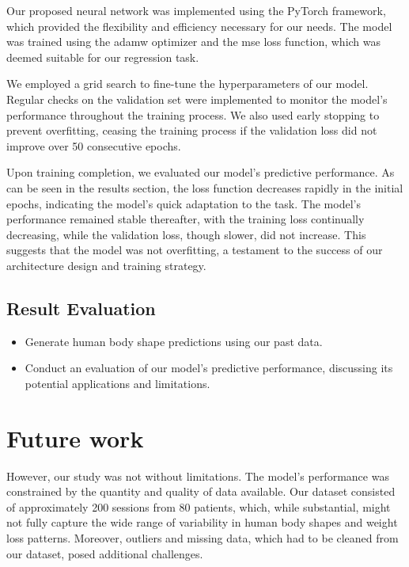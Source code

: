 Our proposed neural network was implemented using the PyTorch framework, which
provided the flexibility and efficiency necessary for our needs. The model was
trained using the \gls{adamw} optimizer and the \gls{mse} loss function, which
was deemed suitable for our regression task.

We employed a grid search to fine-tune the hyperparameters of our model.
Regular checks on the validation set were implemented to monitor the model's
performance throughout the training process. We also used early stopping to
prevent overfitting, ceasing the training process if the validation loss did
not improve over 50 consecutive epochs.

Upon training completion, we evaluated our model's predictive performance. As
can be seen in the results section, the loss function decreases rapidly in the
initial epochs, indicating the model's quick adaptation to the task. The
model's performance remained stable thereafter, with the training loss
continually decreasing, while the validation loss, though slower, did not
increase. This suggests that the model was not overfitting, a testament to the
success of our architecture design and training strategy.

\subsection{Result Evaluation}

\begin{itemize}
      \item Generate human body shape predictions using our past data.
      \item Conduct an evaluation of our model's predictive performance, discussing its
            potential applications and limitations.
\end{itemize}


\section{Future work}

However, our study was not without limitations. The model's performance was
constrained by the quantity and quality of data available. Our dataset
consisted of approximately 200 sessions from 80 patients, which, while
substantial, might not fully capture the wide range of variability in human
body shapes and weight loss patterns. Moreover, outliers and missing data,
which had to be cleaned from our dataset, posed additional challenges.

